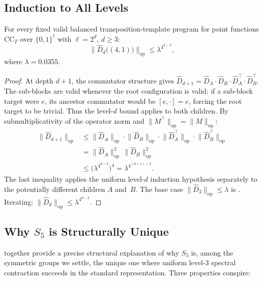 \documentclass[version=final]{iacrcc}
\newcommand{\norm}[1]{\lVert #1 \rVert}
\newcommand{\opn}[1]{\norm{#1}_{\mathrm{op}}}
\newcommand{\Dhat}{\widehat{D}}
\newcommand{\CC}{\mathrm{CC}}
\begin{document}
\subsection{Induction to All Levels}

\begin{theorem}
\label{thm:induction}
For every fixed valid balanced transposition-template program for point functions
$\CC_T$ over $\{0,1\}^\ell$ with $\ell = 2^d$, $d \geq 3$:
\[
\opn{\Dhat_d\bigl((4,1)\bigr)} \leq \lambda^{4^{d-3}},
\]
where $\lambda = 0.0355$.
\end{theorem}

\begin{proof}
At depth $d+1$, the commutator structure gives
$\Dhat_{d+1} = \Dhat_A \cdot \Dhat_B \cdot \Dhat_A^\top \cdot \Dhat_B^\top$.
The sub-blocks are valid whenever the root configuration is valid: if a
sub-block target were $e$, its ancestor commutator would be $[e,\cdot]=e$,
forcing the root target to be trivial. Thus the level-$d$ bound applies to
both children.
By submultiplicativity of the operator norm and $\opn{M^\top} = \opn{M}$:
\[
\begin{aligned}
\opn{\Dhat_{d+1}}
&\leq \opn{\Dhat_A} \cdot \opn{\Dhat_B} \cdot
        \opn{\Dhat_A^\top} \cdot \opn{\Dhat_B^\top} \\
&= \opn{\Dhat_A}^2\,\opn{\Dhat_B}^2 \\
&\leq \bigl(\lambda^{4^{d-3}}\bigr)^4
 = \lambda^{4^{(d+1)-3}}.
\end{aligned}
\]
The last inequality applies the uniform level-$d$ induction hypothesis
separately to the potentially different children $A$ and~$B$.
The base case $\opn{\Dhat_3} \leq \lambda$ is .
Iterating: $\opn{\Dhat_d} \leq \lambda^{4^{d-3}}$.
\end{proof}


\subsection{\texorpdfstring{Why $S_5$ is Structurally Unique}{Why S5 is Structurally Unique}}
\label{sec:s5-unique}

 together provide a precise structural
explanation of why $S_5$ is, among the symmetric groups we settle, the unique
one where uniform level-$3$ spectral contraction succeeds in the standard representation.
Three properties conspire:
\end{document}
